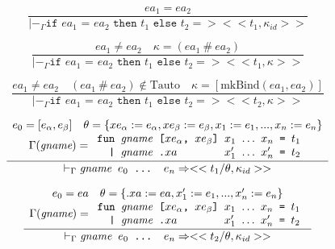 \documentclass[10pt]{../sigplanconf}
\newcommand{\nfrac}[2]{\frac{\displaystyle{#1}}{\displaystyle{#2}}}
\newcommand{\tagsc}[1]{\tag{\scshape #1}}
\begin{document}
\begin{figure}
  \begin{equation}
    \nfrac{
      ea_1 = ea_2
    }{
      |-_\Gamma \texttt{if $ea_1$ = $ea_2$ then $t_1$ else $t_2$} => <<t_1, \kappa_{id}>>
    } \tagsc{If-Eq}
  \end{equation}

  \begin{equation}
    \nfrac{
      ea_1 \neq ea_2 \quad \kappa = (ea_1\ \#\ ea_2)
    }{
      |-_\Gamma \texttt{if $ea_1$ = $ea_2$ then $t_1$ else $t_2$} => <<t_1, \kappa>>
    } \tagsc{If-NotEq-A}
  \end{equation}

  \begin{equation}
    \nfrac{
      ea_1 \neq ea_2 \quad (ea_1\ \#\ ea_2) \not \in \textrm{Tauto} \quad \kappa = [\textrm{mkBind}(ea_1, ea_2)]
    }{
      |-_\Gamma \texttt{if $ea_1$ = $ea_2$ then $t_1$ else $t_2$} => <<t_2, \kappa>>
    } \tagsc{If-NotEq-B}
  \end{equation}

  \begin{equation}
    \nfrac{
      \begin{array}{c}
        e_0 = [e_\alpha, e_\beta] \quad \theta = \{ xe_\alpha := e_\alpha, xe_\beta := e_\beta, x_1 := e_1, ..., x_n := e_n \} \\
        \Gamma(\textit{gname}) =
        \begin{array}{l}
          \texttt{fun \textit{\rmfamily gname} [$xe_\alpha$, $xe_\beta$] $x_1$ $\ldots$ $x_n$ = $t_1$} \\
          \texttt{\ \ | \textit{\rmfamily gname}\ \texttt{.}$xa$ \hspace{1.1cm} $x_1'$ $\ldots$ $x_n'$ = $t_2$} \\
        \end{array}
      \end{array}
    }{
      |-_\Gamma \texttt{\textit{\rmfamily gname} $e_0$ ... $e_n$} => <<t_1 / \theta, \kappa_{id} >>
    }
  \end{equation}

  \begin{equation}
    \nfrac{
      \begin{array}{c}
        e_0 = ea \quad \theta = \{ .xa := ea, x_1' := e_1, ..., x_n' := e_n \} \\
        \Gamma(\textit{gname}) =
        \begin{array}{l}
          \texttt{fun \textit{\rmfamily gname} [$xe_\alpha$, $xe_\beta$] $x_1$ $\ldots$ $x_n$ = $t_1$} \\
          \texttt{\ \ | \textit{\rmfamily gname}\ \texttt{.}$xa$ \hspace{1.1cm} $x_1'$ $\ldots$ $x_n'$ = $t_2$} \\
        \end{array}
      \end{array}
    }{
      |-_\Gamma \texttt{\textit{\rmfamily gname} $e_0$ ... $e_n$} => <<t_2 / \theta, \kappa_{id}>>
    }
  \end{equation}


\end{figure}
\end{document}
